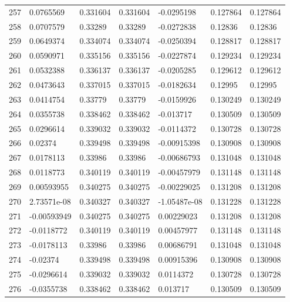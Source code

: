 \begin{longtable}{l|lll|lll}
 257 &  0.0765569   & 0.331604    & 0.331604    & -0.0295198   & 0.127864    & 0.127864    \\
 258 &  0.0707579   & 0.33289     & 0.33289     & -0.0272838   & 0.12836     & 0.12836     \\
 259 &  0.0649374   & 0.334074    & 0.334074    & -0.0250394   & 0.128817    & 0.128817    \\
 260 &  0.0590971   & 0.335156    & 0.335156    & -0.0227874   & 0.129234    & 0.129234    \\
 261 &  0.0532388   & 0.336137    & 0.336137    & -0.0205285   & 0.129612    & 0.129612    \\
 262 &  0.0473643   & 0.337015    & 0.337015    & -0.0182634   & 0.12995     & 0.12995     \\
 263 &  0.0414754   & 0.33779     & 0.33779     & -0.0159926   & 0.130249    & 0.130249    \\
 264 &  0.0355738   & 0.338462    & 0.338462    & -0.013717    & 0.130509    & 0.130509    \\
 265 &  0.0296614   & 0.339032    & 0.339032    & -0.0114372   & 0.130728    & 0.130728    \\
 266 &  0.02374     & 0.339498    & 0.339498    & -0.00915398  & 0.130908    & 0.130908    \\
 267 &  0.0178113   & 0.33986     & 0.33986     & -0.00686793  & 0.131048    & 0.131048    \\
 268 &  0.0118773   & 0.340119    & 0.340119    & -0.00457979  & 0.131148    & 0.131148    \\
 269 &  0.00593955  & 0.340275    & 0.340275    & -0.00229025  & 0.131208    & 0.131208    \\
 270 &  2.73571e-08 & 0.340327    & 0.340327    & -1.05487e-08 & 0.131228    & 0.131228    \\
 271 & -0.00593949  & 0.340275    & 0.340275    &  0.00229023  & 0.131208    & 0.131208    \\
 272 & -0.0118772   & 0.340119    & 0.340119    &  0.00457977  & 0.131148    & 0.131148    \\
 273 & -0.0178113   & 0.33986     & 0.33986     &  0.00686791  & 0.131048    & 0.131048    \\
 274 & -0.02374     & 0.339498    & 0.339498    &  0.00915396  & 0.130908    & 0.130908    \\
 275 & -0.0296614   & 0.339032    & 0.339032    &  0.0114372   & 0.130728    & 0.130728    \\
 276 & -0.0355738   & 0.338462    & 0.338462    &  0.013717    & 0.130509    & 0.130509    \\

\end{longtable}
